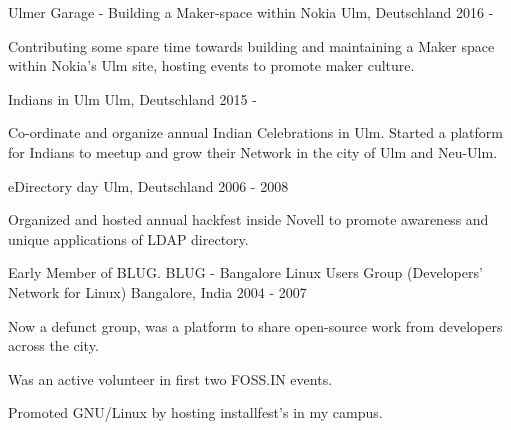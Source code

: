 

\begin{cventries}
	\cventry
    {} %
    {Ulmer Garage - Building a Maker-space within Nokia} %
    {Ulm, Deutschland} %
    {2016 - } %
    {
    	  \begin{cvitems}
    	    \item {Contributing some spare time towards building and maintaining a Maker space within Nokia's Ulm site, hosting events to promote maker culture.}
    	  \end{cvitems}
    }
	\cventry
    {} %
    {Indians in Ulm } %
    {Ulm, Deutschland} %
    {2015 - } %
    {
    	  \begin{cvitems}
    	    \item {Co-ordinate and organize annual Indian Celebrations in Ulm. Started a platform for Indians to meetup and grow their Network in the city of Ulm and Neu-Ulm.}
    	  \end{cvitems}
    }
	\cventry
    {} %
    {eDirectory day} %
    {Ulm, Deutschland} %
    {2006 - 2008} %
    {
    	  \begin{cvitems}
    	    \item {Organized and hosted annual hackfest inside Novell to promote awareness and unique applications of LDAP directory.}
    	  \end{cvitems}
    }
  \cventry
    {Early Member of BLUG.} %
    {BLUG - Bangalore Linux Users Group (Developers’ Network for Linux)} %
    {Bangalore, India} %
    {2004 - 2007} %
    {
      \begin{cvitems} %
       \item {Now a defunct group, was a platform to share open-source work from developers across the city.}
       \item {Was an active volunteer in first two FOSS.IN events.}
       \item {Promoted GNU/Linux by hosting installfest's in my campus.}
      \end{cvitems}
    }

\end{cventries}

